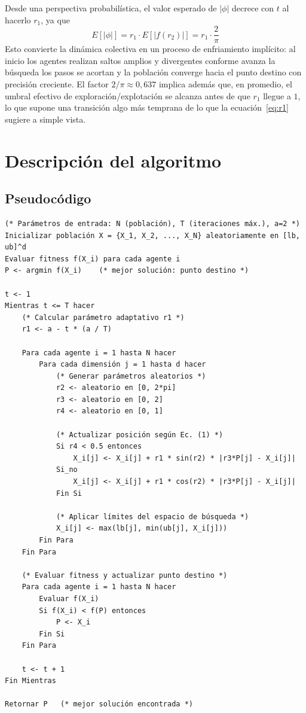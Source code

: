 \documentclass[12pt,a4paper]{article}
\begin{document}
Desde una perspectiva probabilística, el valor esperado de $|\phi|$ decrece con $t$ al hacerlo $r_1$, ya que
\begin{equation*}
    E[|\phi|] = r_1 \cdot E[|f(r_2)|] = r_1 \cdot \frac{2}{\pi}
\end{equation*}
Esto convierte la dinámica colectiva en un proceso de enfriamiento implícito: al inicio los agentes realizan saltos amplios y divergentes conforme avanza la búsqueda los pasos se acortan y la población converge hacia el punto destino con precisión creciente. El factor $2/\pi \approx 0{,}637$ implica además que, en promedio, el umbral efectivo de exploración/explotación se alcanza antes de que $r_1$ llegue a $1$, lo que supone una transición algo más temprana de lo que la ecuación~\eqref{eq:r1} sugiere a simple vista.

\section{Descripción del algoritmo}

\subsection{Pseudocódigo}

\begin{lstlisting}[caption={Pseudocódigo del Sine Cosine Algorithm (SCA)}, label={lst:sca}]
(* Parámetros de entrada: N (población), T (iteraciones máx.), a=2 *)
Inicializar población X = {X_1, X_2, ..., X_N} aleatoriamente en [lb, ub]^d
Evaluar fitness f(X_i) para cada agente i
P <- argmin f(X_i)    (* mejor solución: punto destino *)

t <- 1
Mientras t <= T hacer
    (* Calcular parámetro adaptativo r1 *)
    r1 <- a - t * (a / T)

    Para cada agente i = 1 hasta N hacer
        Para cada dimensión j = 1 hasta d hacer
            (* Generar parámetros aleatorios *)
            r2 <- aleatorio en [0, 2*pi]
            r3 <- aleatorio en [0, 2]
            r4 <- aleatorio en [0, 1]

            (* Actualizar posición según Ec. (1) *)
            Si r4 < 0.5 entonces
                X_i[j] <- X_i[j] + r1 * sin(r2) * |r3*P[j] - X_i[j]|
            Si_no
                X_i[j] <- X_i[j] + r1 * cos(r2) * |r3*P[j] - X_i[j]|
            Fin Si

            (* Aplicar límites del espacio de búsqueda *)
            X_i[j] <- max(lb[j], min(ub[j], X_i[j]))
        Fin Para
    Fin Para

    (* Evaluar fitness y actualizar punto destino *)
    Para cada agente i = 1 hasta N hacer
        Evaluar f(X_i)
        Si f(X_i) < f(P) entonces
            P <- X_i
        Fin Si
    Fin Para

    t <- t + 1
Fin Mientras

Retornar P   (* mejor solución encontrada *)
\end{lstlisting}
\end{document}
